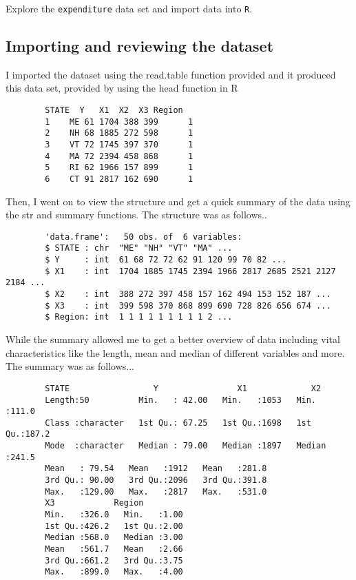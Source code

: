 \documentclass[12pt,letterpaper]{article}
\begin{document}
\vspace{.5cm}
\noindent Explore the \texttt{expenditure} data set and import data into \texttt{R}.
\vspace{.5cm}

\subsection*{Importing and reviewing the dataset}
    I imported the dataset using the read.table function provided and it produced this data set, provided by using the head function in R

	\begin{verbatim}
		STATE  Y   X1  X2  X3 Region
		1    ME 61 1704 388 399      1
		2    NH 68 1885 272 598      1
		3    VT 72 1745 397 370      1
		4    MA 72 2394 458 868      1
		5    RI 62 1966 157 899      1
		6    CT 91 2817 162 690      1
	\end{verbatim}
	
Then, I went on to view the structure and get a quick summary of the data using the str and summary functions.
The structure was as follows..
    \begin{verbatim}
    	'data.frame':	50 obs. of  6 variables:
    	$ STATE : chr  "ME" "NH" "VT" "MA" ...
    	$ Y     : int  61 68 72 72 62 91 120 99 70 82 ...
    	$ X1    : int  1704 1885 1745 2394 1966 2817 2685 2521 2127 2184 ...
    	$ X2    : int  388 272 397 458 157 162 494 153 152 187 ...
    	$ X3    : int  399 598 370 868 899 690 728 826 656 674 ...
    	$ Region: int  1 1 1 1 1 1 1 1 1 2 ...
    \end{verbatim}
    
 While the summary allowed me to get a better overview of data including vital characteristics like the length, mean and median of different variables and more.
 The summary was as follows...
    \begin{verbatim}
    	STATE                 Y                X1             X2       
    	Length:50          Min.   : 42.00   Min.   :1053   Min.   :111.0  
    	Class :character   1st Qu.: 67.25   1st Qu.:1698   1st Qu.:187.2  
    	Mode  :character   Median : 79.00   Median :1897   Median :241.5  
    	Mean   : 79.54   Mean   :1912   Mean   :281.8  
    	3rd Qu.: 90.00   3rd Qu.:2096   3rd Qu.:391.8  
    	Max.   :129.00   Max.   :2817   Max.   :531.0  
    	X3            Region    
    	Min.   :326.0   Min.   :1.00  
    	1st Qu.:426.2   1st Qu.:2.00  
    	Median :568.0   Median :3.00  
    	Mean   :561.7   Mean   :2.66  
    	3rd Qu.:661.2   3rd Qu.:3.75  
    	Max.   :899.0   Max.   :4.00  
    \end{verbatim}
    
\end{document}
